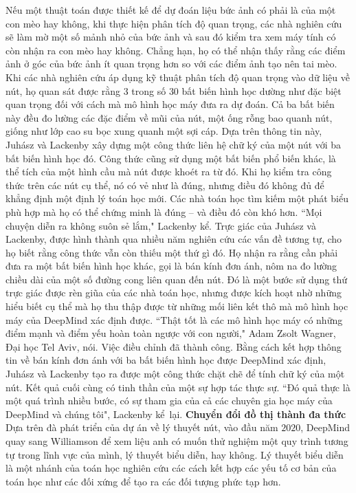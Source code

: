 \begin{multicols}{2}
	\vskip 0.05cm
	Nếu một thuật toán được thiết kế để dự đoán liệu bức ảnh có phải là của một con mèo hay không, khi thực hiện phân tích độ quan trọng, các nhà nghiên cứu sẽ làm mờ một số mảnh nhỏ của bức ảnh và sau đó kiểm tra xem máy tính có còn nhận ra con mèo hay không. Chẳng hạn, họ có thể nhận thấy rằng các điểm ảnh ở góc của bức ảnh ít quan trọng hơn so với các điểm ảnh tạo nên tai mèo.
	\vskip 0.05cm
	Khi các nhà nghiên cứu áp dụng kỹ thuật phân tích độ quan trọng vào dữ liệu về nút, họ quan sát được rằng $3$ trong số $30$ bất biến hình học dường như đặc biệt quan trọng đối với cách mà mô hình học máy đưa ra dự đoán. Cả ba bất biến này đều đo lường các đặc điểm về mũi của nút, một ống rỗng bao quanh nút, giống như lớp cao su bọc xung quanh một sợi cáp.
	\vskip 0.05cm
	Dựa trên thông tin này, Juhász và Lackenby xây dựng một công thức liên hệ chữ ký của một nút với ba bất biến hình học đó. Công thức cũng sử dụng một bất biến phổ biến khác, là thể tích của một hình cầu mà nút được khoét ra từ đó. Khi họ kiểm tra công thức trên các nút cụ thể, nó có vẻ như là đúng, nhưng điều đó không đủ để khẳng định một định lý toán học mới. Các nhà toán học tìm kiếm một phát biểu phù hợp mà họ có thể chứng minh là đúng -- và điều đó còn khó hơn.
	\vskip 0.05cm
	``Mọi chuyện diễn ra không suôn sẻ lắm," Lackenby kể.
	\vskip 0.05cm
	Trực giác của Juhász và Lackenby, được hình thành qua nhiều năm nghiên cứu các vấn đề tương tự, cho họ biết rằng công thức vẫn còn thiếu một thứ gì đó. Họ nhận ra rằng cần phải đưa ra một bất biến hình học khác, gọi là bán kính đơn ánh, nôm na đo lường chiều dài của một số đường cong liên quan đến nút. Đó là một bước sử dụng thứ trực giác được rèn giũa của các nhà toán học, nhưng được kích hoạt nhờ những hiểu biết cụ thể mà họ thu thập được từ những mối liên kết thô mà mô hình học máy của DeepMind xác định được.
	\vskip 0.05cm
	``Thật tốt là các mô hình học máy có những điểm mạnh và điểm yếu hoàn toàn ngược với con người," Adam Zsolt Wagner, Đại học Tel Aviv, nói.
	\vskip 0.05cm
	Việc điều chỉnh đã thành công. Bằng cách kết hợp thông tin về bán kính đơn ánh với ba bất biến hình học được DeepMind xác định, Juhász và Lackenby tạo ra được một công thức chặt chẽ để tính chữ ký của một nút. Kết quả cuối cùng có tinh thần của một sự hợp tác thực sự.
	\vskip 0.05cm
	``Đó quả thực là một quá trình nhiều bước, có sự tham gia của cả các chuyên gia học máy của DeepMind và chúng tôi", Lackenby kể~lại.
	\vskip 0.05cm
	\textbf{\color{duongvaotoanhoc}Chuyển đổi đồ thị thành đa thức}
	\vskip 0.05cm
	Dựa trên đà phát triển của dự án về lý thuyết nút, vào đầu năm $2020$, DeepMind quay sang  Williamson để xem liệu anh có muốn thử nghiệm một quy trình tương tự trong lĩnh vực của mình, lý thuyết biểu diễn, hay không. Lý thuyết biểu diễn là một nhánh của toán học nghiên cứu các cách kết hợp các yếu tố cơ bản của toán học như các đối xứng để tạo ra các đối tượng phức tạp hơn.

\end{multicols}
